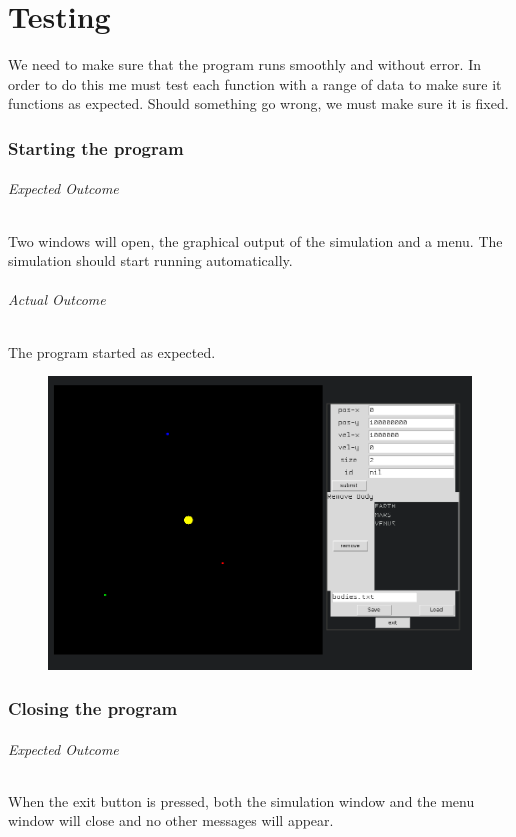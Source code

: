 \part{Testing}

We need to make sure that the program runs smoothly and without error. In order
to do this me must test each function with a range of data to make sure it
functions as expected. Should something go wrong, we must make sure it is fixed.

\section{Starting the program}
\paragraph{Expected Outcome} 
Two windows will open, the graphical output of the simulation and a menu. The
simulation should start running automatically. 
\paragraph{Actual Outcome} 
The program started as expected.
\begin{figure}[H]
	\includegraphics[width=\textwidth]{./img/start.png}
\end{figure}

\section{Closing the program}
\paragraph{Expected Outcome}
When the exit button is pressed, both the simulation window and the menu window
will close and no other messages will appear.
